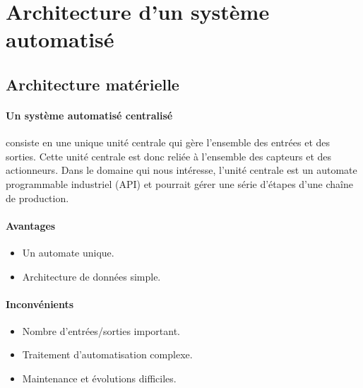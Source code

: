 \section{Architecture d'un système automatisé}
\label{sec:architecture}
\subsection{Architecture matérielle}
\label{subsec:architecture_materielle}
\paragraph{Un système automatisé centralisé} consiste en une unique unité centrale qui gère l'ensemble des entrées et des sorties. Cette unité centrale est donc reliée à l'ensemble des capteurs et des actionneurs.
Dans le domaine qui nous intéresse, l'unité centrale est un automate programmable industriel (API) et pourrait gérer une série d'étapes d'une chaîne de production.

\begin{minipage}{0.45\linewidth}
    \paragraph{Avantages}
    \begin{itemize}
        \item Un automate unique.
        \item Architecture de données simple.
    \end{itemize}
\end{minipage}%
%
\begin{minipage}{0.45\linewidth}
    \paragraph{Inconvénients}
    \begin{itemize}
        \item Nombre d'entrées/sorties important.
        \item Traitement d'automatisation complexe.
        \item Maintenance et évolutions difficiles.
    \end{itemize}
\end{minipage}

\lstDeleteShortInline~
\begin{UPSTIactivite}
    \vspace{4cm}
\end{UPSTIactivite}


